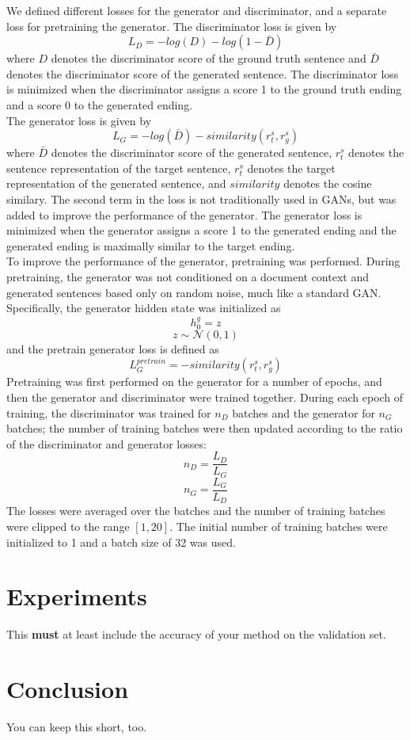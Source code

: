 \documentclass{article}
\begin{document}
We defined different losses for the generator and discriminator, and a separate loss for pretraining the generator. The discriminator loss is given by
$$ L_{D} = -log(D) - log(1-\bar{D})$$
where $D$ denotes the discriminator score of the ground truth sentence and $\bar{D}$ denotes the discriminator score of the generated sentence. The discriminator loss is minimized when the discriminator assigns a score 1 to the ground truth ending and a score 0 to the generated ending. \\
The generator loss is given by
$$ L_{G} = -log(\bar{D}) - similarity(r^{s}_{t}, r^{s}_{g}) $$
where $\bar{D}$ denotes the discriminator score of the generated sentence, $r^{s}_{t}$ denotes the sentence representation of the target sentence, $r^{s}_{t}$ denotes the target representation of the generated sentence, and $similarity$ denotes the cosine similary. The second term in the loss is not traditionally used in GANs, but was added to improve the performance of the generator. The generator loss is minimized when the generator assigns a score 1 to the generated ending and the generated ending is maximally similar to the target ending. \\
To improve the performance of the generator, pretraining was performed. During pretraining, the generator was not conditioned on a document context and generated sentences based only on random noise, much like a standard GAN. Specifically, the generator hidden state was initialized as
$$ h^{g}_{0} = z $$
$$ z \sim \mathcal{N}(0,1) $$
and the pretrain generator loss is defined as
$$ L_{G}^{pretrain} = -similarity(r^{s}_{t}, r^{s}_{g}) $$
Pretraining was first performed on the generator for a number of epochs, and then the generator and discriminator were trained together. During each epoch of training, the discriminator was trained for $n_{D}$ batches and the generator for $n_{G}$ batches; the number of training batches were then updated according to the ratio of the discriminator and generator losses:
$$ n_{D} = \frac{L_{D}}{L_{G}} $$ 
$$ n_{G} = \frac{L_{G}}{L_{D}} $$
The losses were averaged over the batches and the number of training batches were clipped to the range $[1,20]$. The initial number of training batches were initialized to 1 and a batch size of 32 was used.

\section{Experiments}
This {\bf must} at least include the accuracy of your method on the validation set.
\section{Conclusion}
You can keep this short, too.
\end{document}
